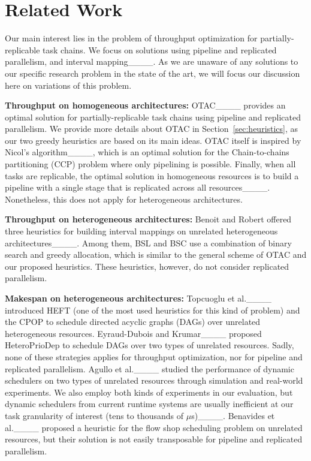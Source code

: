 \section{Related Work}
\label{sec:rw}


Our main interest lies in the problem of throughput optimization for partially-replicable task chains.
We focus on solutions using pipeline and replicated parallelism, and interval mapping____.
As we are unaware of any solutions to our specific research problem in the state of the art, we will focus our discussion here on variations of this problem.

\textbf{Throughput on homogeneous architectures:}
OTAC____ provides an optimal solution for partially-replicable task chains using pipeline and replicated parallelism.
We provide more details about OTAC in Section~\ref{sec:heuristics}, as our two greedy heuristics are based on its main ideas.
OTAC itself is inspired by Nicol’s algorithm____, which is an optimal solution for the Chain-to-chains partitioning (CCP) problem where only pipelining is possible.
Finally, when all tasks are replicable, the optimal solution in homogeneous resources is to build a pipeline with a single stage that is replicated across all resources____.
Nonetheless, this does not apply for heterogeneous architectures.

\textbf{Throughput on heterogeneous architectures:}
Benoit and Robert offered three heuristics for building interval mappings on unrelated heterogeneous architectures____.
Among them, BSL and BSC use a combination of binary search and greedy allocation, which is similar to the general scheme of OTAC and our proposed heuristics.
These heuristics, however, do not consider replicated parallelism.

\textbf{Makespan on heterogeneous architectures:} 
Topcuoglu et al.____ introduced HEFT (one of the most used heuristics for this kind of problem) and the CPOP to schedule directed acyclic graphs (DAGs) over unrelated heterogeneous resources.
Eyraud-Dubois and Krumar____ proposed HeteroPrioDep to schedule DAGs over two types of unrelated resources. %
Sadly, none of these strategies applies for throughput optimization, nor for pipeline and replicated parallelism.
Agullo et al.____ studied the performance of dynamic schedulers on two types of unrelated resources through simulation and real-world experiments.
We also employ both kinds of experiments in our evaluation, but dynamic schedulers from current runtime systems are usually inefficient at our task granularity of interest (tens to thousands of $\mu$s)____.
Benavides et al.____ proposed a heuristic for the flow shop scheduling problem on unrelated resources, but their solution is not easily transposable for pipeline and replicated parallelism.

